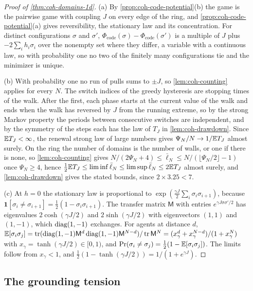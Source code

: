 \begin{proof}[Proof of \cref{thm:coh-domains-1d}]
(a) By \cref{prop:coh-code-potential}(b) the game is the pairwise game with coupling $J$ on every edge of the ring, and \cref{prop:coh-code-potential}(a) gives reversibility, the stationary law and its concentration. For distinct configurations $\sigma$ and $\sigma'$, $\Phi_{\mathrm{code}}(\sigma)-\Phi_{\mathrm{code}}(\sigma')$ is a multiple of $J$ plus $-2\sum_{i}h_i\sigma_i$ over the nonempty set where they differ, a variable with a continuous law, so with probability one no two of the finitely many configurations tie and the minimizer is unique.

(b) With probability one no run of pulls sums to $\pm J$, so \cref{lem:coh-counting} applies for every $N$. The switch indices of the greedy hysteresis are stopping times of the walk. After the first, each phase starts at the current value of the walk and ends when the walk has reversed by $J$ from the running extreme, so by the strong Markov property the periods between consecutive switches are independent, and by the symmetry of the steps each has the law of $T_J$ in \cref{lem:coh-drawdown}. Since $\mathbb{E} T_J<\infty$, the renewal strong law of large numbers gives $\Psi_N/N\to1/\mathbb{E} T_J$ almost surely. On the ring the number of domains is the number of walls, or one if there is none, so \cref{lem:coh-counting} gives $N/(2\Psi_N+4)\le\bar\ell_N\le N/(\lfloor\Psi_N/2\rfloor-1)$ once $\Psi_N\ge4$, hence $\frac12\mathbb{E} T_J\le\liminf\bar\ell_N\le\limsup\bar\ell_N\le2\mathbb{E} T_J$ almost surely, and \cref{lem:coh-drawdown} gives the stated bounds, since $2\times3.25<7$.

(c) At $h=0$ the stationary law is proportional to $\exp(\frac{\gamma J}2\sum_i\sigma_i\sigma_{i+1})$, because $\mathbf 1[\sigma_i\ne\sigma_{i+1}]=\frac12(1-\sigma_i\sigma_{i+1})$. The transfer matrix $\mathsf M$ with entries $e^{\gamma J\sigma\sigma'/2}$ has eigenvalues $2\cosh(\gamma J/2)$ and $2\sinh(\gamma J/2)$ with eigenvectors $(1,1)$ and $(1,-1)$, which $\operatorname{diag}(1,-1)$ exchanges. For agents at distance $d$, $\mathbb{E}[\sigma_i\sigma_j]=\operatorname{tr}(\operatorname{diag}(1,-1)\mathsf M^d\operatorname{diag}(1,-1)\mathsf M^{N-d})/\operatorname{tr}\mathsf M^N=(x_\gamma^d+x_\gamma^{N-d})/(1+x_\gamma^N)$ with $x_\gamma=\tanh(\gamma J/2)\in[0,1)$, and $\Pr(\sigma_i\ne\sigma_j)=\frac12(1-\mathbb{E}[\sigma_i\sigma_j])$. The limits follow from $x_\gamma<1$, and $\frac12(1-\tanh(\gamma J/2))=1/(1+e^{\gamma J})$.
\end{proof}

\subsection{The grounding tension}\label{app:coh-tension}

